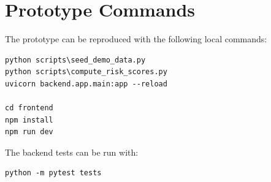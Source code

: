 \section{Prototype Commands}
\label{app:commands}

The prototype can be reproduced with the following local commands:

\begin{verbatim}
python scripts\seed_demo_data.py
python scripts\compute_risk_scores.py
uvicorn backend.app.main:app --reload

cd frontend
npm install
npm run dev
\end{verbatim}

The backend tests can be run with:

\begin{verbatim}
python -m pytest tests
\end{verbatim}
